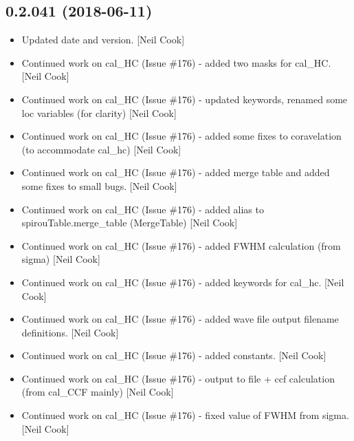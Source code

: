 \documentclass[a4paper,10pt,english]{report}
\begin{document}
\subsection{0.2.041 (2018-06-11)}
\label{\detokenize{misc/changelog:id422}}\begin{itemize}
\item {} 
Updated date and version. {[}Neil Cook{]}

\item {} 
Continued work on cal\_HC (Issue \#176) - added two masks for cal\_HC.
{[}Neil Cook{]}

\item {} 
Continued work on cal\_HC (Issue \#176) - updated keywords, renamed some
loc variables (for clarity) {[}Neil Cook{]}

\item {} 
Continued work on cal\_HC (Issue \#176) - added some fixes to
coravelation (to accommodate cal\_hc) {[}Neil Cook{]}

\item {} 
Continued work on cal\_HC (Issue \#176) - added merge table and added
some fixes to small bugs. {[}Neil Cook{]}

\item {} 
Continued work on cal\_HC (Issue \#176) - added alias to
spirouTable.merge\_table (MergeTable) {[}Neil Cook{]}

\item {} 
Continued work on cal\_HC (Issue \#176) - added FWHM calculation (from
sigma) {[}Neil Cook{]}

\item {} 
Continued work on cal\_HC (Issue \#176) - added keywords for cal\_hc.
{[}Neil Cook{]}

\item {} 
Continued work on cal\_HC (Issue \#176) - added wave file output
filename definitions. {[}Neil Cook{]}

\item {} 
Continued work on cal\_HC (Issue \#176) - added constants. {[}Neil Cook{]}

\item {} 
Continued work on cal\_HC (Issue \#176) - output to file + ccf
calculation (from cal\_CCF mainly) {[}Neil Cook{]}

\item {} 
Continued work on cal\_HC (Issue \#176) - fixed value of FWHM from
sigma. {[}Neil Cook{]}

\end{itemize}
\end{document}
